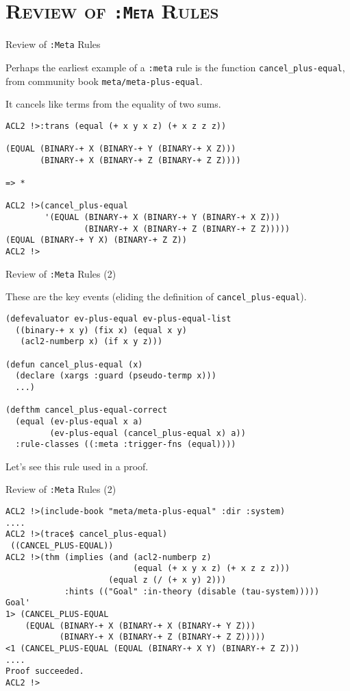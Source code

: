 \section{\scshape Review of {\tt :Meta} Rules}
\begin{frame}[fragile]{Review of {\tt :Meta} Rules}

Perhaps the earliest example of a {\tt :meta} rule is the function
\verb|cancel_plus-equal|, from
community book {\tt meta/meta-plus-equal}.

It cancels like terms from the equality of two sums.

{\footnotesize
\begin{verbatim}
ACL2 !>:trans (equal (+ x y x z) (+ x z z z))

(EQUAL (BINARY-+ X (BINARY-+ Y (BINARY-+ X Z)))
       (BINARY-+ X (BINARY-+ Z (BINARY-+ Z Z))))

=> *

ACL2 !>(cancel_plus-equal
        '(EQUAL (BINARY-+ X (BINARY-+ Y (BINARY-+ X Z)))
                (BINARY-+ X (BINARY-+ Z (BINARY-+ Z Z)))))
(EQUAL (BINARY-+ Y X) (BINARY-+ Z Z))
ACL2 !>
\end{verbatim}
}

\end{frame}
\begin{frame}[fragile]{Review of {\tt :Meta} Rules (2)}

These are the key events (eliding the definition of
\verb|cancel_plus-equal|).

\begin{verbatim}
(defevaluator ev-plus-equal ev-plus-equal-list
  ((binary-+ x y) (fix x) (equal x y)
   (acl2-numberp x) (if x y z)))

(defun cancel_plus-equal (x)
  (declare (xargs :guard (pseudo-termp x)))
  ...)

(defthm cancel_plus-equal-correct
  (equal (ev-plus-equal x a)
         (ev-plus-equal (cancel_plus-equal x) a))
  :rule-classes ((:meta :trigger-fns (equal))))
\end{verbatim}

Let's see this rule used in a proof.

\end{frame}
\begin{frame}[fragile]{Review of {\tt :Meta} Rules (2)}

{\footnotesize
\begin{verbatim}
ACL2 !>(include-book "meta/meta-plus-equal" :dir :system)
....
ACL2 !>(trace$ cancel_plus-equal)
 ((CANCEL_PLUS-EQUAL))
ACL2 !>(thm (implies (and (acl2-numberp z)
                          (equal (+ x y x z) (+ x z z z)))
                     (equal z (/ (+ x y) 2)))
            :hints (("Goal" :in-theory (disable (tau-system)))))
Goal'
1> (CANCEL_PLUS-EQUAL
    (EQUAL (BINARY-+ X (BINARY-+ X (BINARY-+ Y Z)))
           (BINARY-+ X (BINARY-+ Z (BINARY-+ Z Z)))))
<1 (CANCEL_PLUS-EQUAL (EQUAL (BINARY-+ X Y) (BINARY-+ Z Z)))
....
Proof succeeded.
ACL2 !>
\end{verbatim}
}

\end{frame}
